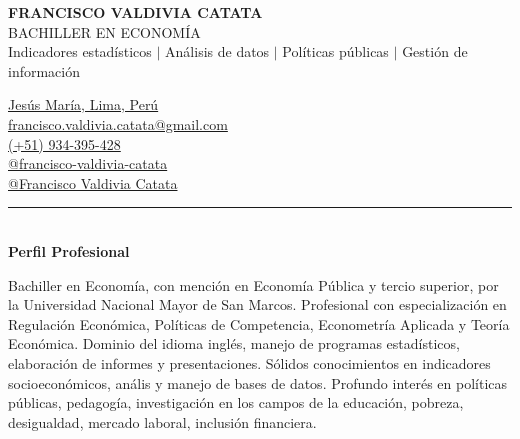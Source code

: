 \documentclass{resume}
\begin{document}
\noindent
\begin{minipage}{0.683\linewidth}
	\MakeUppercase{\LARGE \bf Francisco Valdivia Catata} \\
	\MakeUppercase{Bachiller en Economía} \\
	{\small Indicadores estadísticos $|$ Análisis de datos $|$ Políticas públicas $|$ Gestión de información}
\end{minipage}
\noindent
\begin{minipage}{0.317\textwidth}
	{\color{vino}\faMapMarker} {\href{https://www.google.com/maps/place/Jesús+María/@-12.0786039,-77.0600128,15z/data=!3m1!4b1!4m6!3m5!1s0x9105c8e3646ab8d7:0x848660d2fc40ce50!8m2!3d-12.0824947!4d-77.0506092!16zL20vMDd0Z2c4?entry=ttu}{Jesús María, Lima, Perú}} \\
	{\color{vino}\faEnvelopeSquare} {\href{mailto:francisco.valdivia.catata@gmail.com}{francisco.valdivia.catata@gmail.com}} \\
	{\color{vino}\faPhone} {\href{tel:934395428}{(+51) 934-395-428}} \\
	{\color{vino}\faLinkedinSquare} {\href{https://www.linkedin.com/in/francisco-valdivia-catata/}{@francisco-valdivia-catata}}	\\
	{\color{vino}\faGithub} {\href{https://github.com/SrFerald}{@Francisco Valdivia Catata}}
\end{minipage}
\vspace{-3pt}


{\color{vino} \noindent \rule{\textwidth}{1pt}} \\
{\color{vino} \noindent \faUser \; {\large \bf Perfil Profesional}}
\vspace{3pt}

\noindent Bachiller en Economía, con mención en Economía Pública y tercio superior, por la Universidad Nacional Mayor de San Marcos.
Profesional con especialización en Regulación Económica, Políticas de Competencia, Econometría Aplicada y Teoría Económica.
Dominio del idioma inglés, manejo de programas estadísticos, elaboración de informes y presentaciones.
Sólidos conocimientos en indicadores socioeconómicos, anális y manejo de bases de datos.
Profundo interés en políticas públicas, pedagogía, investigación en los campos de la educación, pobreza, desigualdad, mercado laboral, inclusión financiera.
\vspace{3pt}

\end{document}
